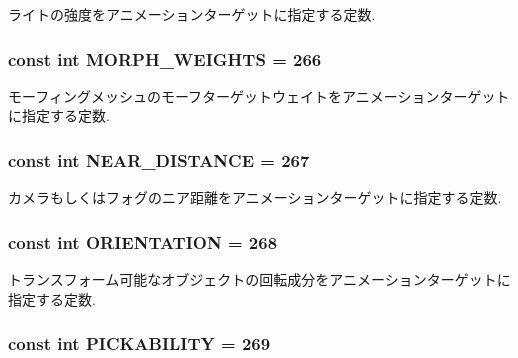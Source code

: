 ライトの強度をアニメーションターゲットに指定する定数. \hypertarget{classm3g_1_1AnimationTrack_d75f3e3033e268d0a74f9533cfa9b9d6}{
\subsubsection[{MORPH\_\-WEIGHTS}]{\setlength{\rightskip}{0pt plus 5cm}const int {\bf MORPH\_\-WEIGHTS} = 266}}
\label{classm3g_1_1AnimationTrack_d75f3e3033e268d0a74f9533cfa9b9d6}


モーフィングメッシュのモーフターゲットウェイトをアニメーションターゲットに指定する定数. \hypertarget{classm3g_1_1AnimationTrack_74f49e3b52778aff378dac012e59cdb2}{
\subsubsection[{NEAR\_\-DISTANCE}]{\setlength{\rightskip}{0pt plus 5cm}const int {\bf NEAR\_\-DISTANCE} = 267}}
\label{classm3g_1_1AnimationTrack_74f49e3b52778aff378dac012e59cdb2}


カメラもしくはフォグのニア距離をアニメーションターゲットに指定する定数. \hypertarget{classm3g_1_1AnimationTrack_c7fe423a6a639520b0b3d1c1e663784b}{
\subsubsection[{ORIENTATION}]{\setlength{\rightskip}{0pt plus 5cm}const int {\bf ORIENTATION} = 268}}
\label{classm3g_1_1AnimationTrack_c7fe423a6a639520b0b3d1c1e663784b}


トランスフォーム可能なオブジェクトの回転成分をアニメーションターゲットに 指定する定数. \hypertarget{classm3g_1_1AnimationTrack_87fcd8136941a05a8a95c61e499692e0}{
\subsubsection[{PICKABILITY}]{\setlength{\rightskip}{0pt plus 5cm}const int {\bf PICKABILITY} = 269}}
\label{classm3g_1_1AnimationTrack_87fcd8136941a05a8a95c61e499692e0}


